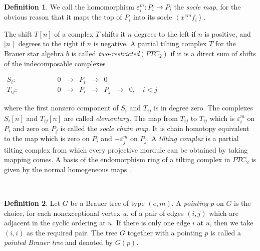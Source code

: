 \documentclass[11pt,english]{article}
\numberwithin{figure}{section}
\numberwithin{equation}{section}
\numberwithin{table}{section}
\theoremstyle{definition}
\newtheorem{defn}{Definition}[section]
\theoremstyle{remark}
\begin{document}
\noindent \begin{defn}We call the homomorphism $\varepsilon_{i}^{m}:P_{i}\rightarrow P_{i}$
	the \textit{socle map}, for the obvious reason that it maps the top
	of $P_{i}$ into its socle \(\left\langle {{x^{em}}{f_i}} \right\rangle \).
	\noindent \end{defn}

\noindent The shift $T[n]$ of a complex $T$ shifts it $n$ degrees to the left if $n$ is positive,
and $\mid n\mid$  degrees to the right if $n$ is negative. A partial tilting complex $T$\textit{ }for the Brauer star
algebra $b$ is called \textit{two-restricted}$(PTC_{2})$ if it is
a direct sum of shifts of the indecomposable complexes


\noindent \begin{center}
	$\begin{array}{cccccccccccccc}
		S_{i}: &  &  &  &  &  &  & 0 & \rightarrow & P_{i} & \rightarrow & 0\\
		T_{ij}: &  &  &  &  &  &  & 0 & \rightarrow & P_{i} & \rightarrow & P_{j}& \rightarrow & 0,\quad i< j
		
	\end{array}$
	\par\end{center}


\noindent where the first nonzero  component of $S_{i}$
and $T_{ij}$ is in degree zero. The complexes $S_{i}[n]$ and $T_{ij}[n]$
are called \textit{elementary.} The map from $T_{ij}$ to $T_{ij}$
which is $\varepsilon_{i}^{m}$ on $P_{i}$ and zero on $P_{j}$ is
called the \textit{socle chain map}. It is chain homotopy equivalent
to the map which is zero on $P_{i}$ and $-\varepsilon_{j}^{m}$ on
$P_{j}$. A \textit{tilting complex} is a partial tilting complex from which every projective mordule can be obtained by taking mapping comes. A basis of the endomorphism ring of a tilting 
complex in $PTC_2$ is given by the normal homogeneous maps \cite{SZ1}.


~

\noindent \begin{defn}Let $G$ be a Brauer tree of type $(e,m)$.
	A \textit{pointing} $p$ on $G$ is the choice, for each nonexceptional
	vertex $u$, of a pair of edges $(i,j)$ which are adjacent in the
	cyclic ordering at $u$. If there is only one edge $i$ at $u$, then
	we take $(i,i)$ as the required pair. The tree $G$ together with
	a pointing $p$ is called a \textit{pointed Brauer tree} and denoted by $G(p)$.\end{defn}
\end{document}
